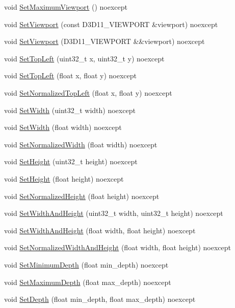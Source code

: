 \begin{DoxyCompactItemize}
\item 
void \hyperlink{structmage_1_1_viewport_a5af006b8ec0464a924c3822265727ee2}{Set\+Maximum\+Viewport} () noexcept
\item 
void \hyperlink{structmage_1_1_viewport_a12a0d7b74ce81786e38f08d399acafc6}{Set\+Viewport} (const D3\+D11\+\_\+\+V\+I\+E\+W\+P\+O\+RT \&viewport) noexcept
\item 
void \hyperlink{structmage_1_1_viewport_a12c41f937452bb1897558f0126947b22}{Set\+Viewport} (D3\+D11\+\_\+\+V\+I\+E\+W\+P\+O\+RT \&\&viewport) noexcept
\item 
void \hyperlink{structmage_1_1_viewport_af885922e6c71d5c9add4412e097a1bd0}{Set\+Top\+Left} (uint32\+\_\+t x, uint32\+\_\+t y) noexcept
\item 
void \hyperlink{structmage_1_1_viewport_acb3a7422f4e70a225e89c3fd8c0ab79c}{Set\+Top\+Left} (float x, float y) noexcept
\item 
void \hyperlink{structmage_1_1_viewport_a3aa0d0353dbb62bce476dee537098a9a}{Set\+Normalized\+Top\+Left} (float x, float y) noexcept
\item 
void \hyperlink{structmage_1_1_viewport_a33b5c5742c3146e282e8bfae5cd765d0}{Set\+Width} (uint32\+\_\+t width) noexcept
\item 
void \hyperlink{structmage_1_1_viewport_a445814c2044dc55811ab6b4502913974}{Set\+Width} (float width) noexcept
\item 
void \hyperlink{structmage_1_1_viewport_a15ca5c3fcdf874c52ac648f38784c2b3}{Set\+Normalized\+Width} (float width) noexcept
\item 
void \hyperlink{structmage_1_1_viewport_a9e7f87ae37470e5a4f75f46040476609}{Set\+Height} (uint32\+\_\+t height) noexcept
\item 
void \hyperlink{structmage_1_1_viewport_ae68911aa2a5f53457ec18ff4dc177530}{Set\+Height} (float height) noexcept
\item 
void \hyperlink{structmage_1_1_viewport_a2cb1d0ae7621778b8ef7797b3e0014b5}{Set\+Normalized\+Height} (float height) noexcept
\item 
void \hyperlink{structmage_1_1_viewport_a5e74ea75e6ff2f733eb10b3e329b944a}{Set\+Width\+And\+Height} (uint32\+\_\+t width, uint32\+\_\+t height) noexcept
\item 
void \hyperlink{structmage_1_1_viewport_a94177f120ae9dbb6ab77b2750be556a8}{Set\+Width\+And\+Height} (float width, float height) noexcept
\item 
void \hyperlink{structmage_1_1_viewport_a31417611b70576d097381ceea7939762}{Set\+Normalized\+Width\+And\+Height} (float width, float height) noexcept
\item 
void \hyperlink{structmage_1_1_viewport_ad6984669ee7837b1c4cfa901a829e867}{Set\+Minimum\+Depth} (float min\+\_\+depth) noexcept
\item 
void \hyperlink{structmage_1_1_viewport_a2dedffd83e06c7d0c05021a4d1cb8923}{Set\+Maximum\+Depth} (float max\+\_\+depth) noexcept
\item 
void \hyperlink{structmage_1_1_viewport_ae651a5c166c83aae67db6181d356f966}{Set\+Depth} (float min\+\_\+depth, float max\+\_\+depth) noexcept
\end{DoxyCompactItemize}
